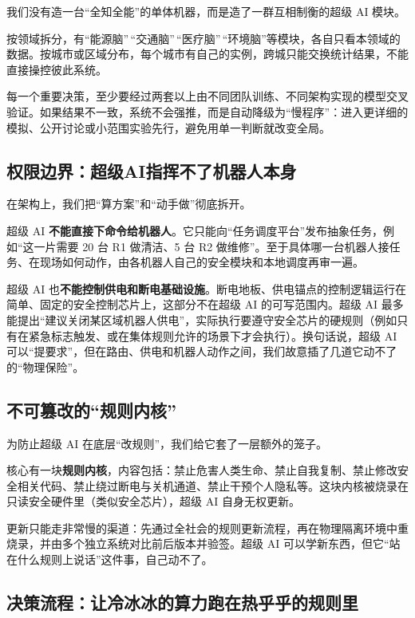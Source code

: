 我们没有造一台``全知全能''的单体机器，而是造了一群互相制衡的超级 AI 模块。

按领域拆分，有``能源脑''\,``交通脑''\,``医疗脑''\,``环境脑''等模块，各自只看本领域的数据。按城市或区域分布，每个城市有自己的实例，跨城只能交换统计结果，不能直接操控彼此系统。

每一个重要决策，至少要经过两套以上由不同团队训练、不同架构实现的模型交叉验证。如果结果不一致，系统不会强推，而是自动降级为``慢程序''：进入更详细的模拟、公开讨论或小范围实验先行，避免用单一判断就改变全局。

\subsection{权限边界：超级AI指挥不了机器人本身}\label{ux6743ux9650ux8fb9ux754cux8d85ux7ea7aiux6307ux6325ux4e0dux4e86ux673aux5668ux4ebaux672cux8eab}

在架构上，我们把``算方案''和``动手做''彻底拆开。

超级 AI \textbf{不能直接下命令给机器人}。它只能向``任务调度平台''发布抽象任务，例如``这一片需要 20 台 R1 做清洁、5 台 R2 做维修''。至于具体哪一台机器人接任务、在现场如何动作，由各机器人自己的安全模块和本地调度再审一遍。

超级 AI 也\textbf{不能控制供电和断电基础设施}。断电地板、供电锚点的控制逻辑运行在简单、固定的安全控制芯片上，这部分不在超级 AI 的可写范围内。超级 AI 最多能提出``建议关闭某区域机器人供电''，实际执行要遵守安全芯片的硬规则（例如只有在紧急标志触发、或在集体规则允许的场景下才会执行）。换句话说，超级 AI 可以``提要求''，但在路由、供电和机器人动作之间，我们故意插了几道它动不了的``物理保险''。

\subsection{不可篡改的``规则内核''}\label{ux4e0dux53efux7be1ux6539ux7684ux89c4ux5219ux5185ux6838}

为防止超级 AI 在底层``改规则''，我们给它套了一层额外的笼子。

核心有一块\textbf{规则内核}，内容包括：禁止危害人类生命、禁止自我复制、禁止修改安全相关代码、禁止绕过断电与关机通道、禁止干预个人隐私等。这块内核被烧录在只读安全硬件里（类似安全芯片），超级 AI 自身无权更新。

更新只能走非常慢的渠道：先通过全社会的规则更新流程，再在物理隔离环境中重烧录，并由多个独立系统对比前后版本并验签。超级 AI 可以学新东西，但它``站在什么规则上说话''这件事，自己动不了。

\subsection{决策流程：让冷冰冰的算力跑在热乎乎的规则里}\label{ux51b3ux7b56ux6d41ux7a0bux8ba9ux51b7ux51b0ux51b0ux7684ux7b97ux529bux8dd1ux5728ux70edux4e4eux4e4eux7684ux89c4ux5219ux91cc}

